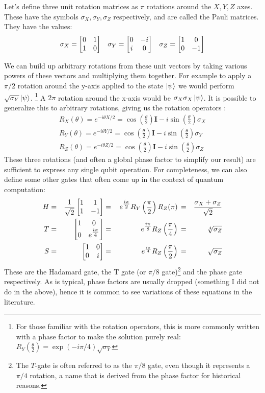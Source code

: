 Let's define three unit rotation matrices as $\pi$ rotations around the $X, Y, Z$ axes. These have the symbols
$\sigma_X, \sigma_Y, \sigma_Z$ respectively, and are called the Pauli matrices.
They have the values:
\begin{align}
  \sigma_X = \begin{bmatrix}0&1\\1&0\end{bmatrix} && \sigma_Y = \begin{bmatrix}0&-i\\i&0\end{bmatrix} && \sigma_Z = \begin{bmatrix}1&0\\0&-1\end{bmatrix}
  \label{eq:pauli}
\end{align}

We can build up arbitrary rotations from these unit vectors by taking various powers of these vectors
and multiplying them together. For example to apply a $\pi/2$ rotation around the y-axis applied to the state $\ket{\psi}$
we would perform $\sqrt{\sigma_Y}\ket{\psi}$. \footnote{For those familiar with the rotation operators,
this is more commonly written with a phase factor to make the solution purely real: $R_Y(\tfrac{\theta}{2})
= \exp(-i\pi/4)\sqrt{\sigma_Y}$}
A $2\pi$ rotation around the x-axis would be $\sigma_X\sigma_X\ket{\psi}$. It is possible to generalize this
to arbitrary rotations, giving us the rotation operators \cite{Nielsen:rot}:
\begin{align}
  R_X(\theta) = e^{-i \theta X/2} = \cos\left(\frac{\theta}{2}\right)\boldsymbol{I} - i \sin\left(\frac{\theta}{2}\right)\sigma_X \\
  R_Y(\theta) = e^{-i \theta Y/2} = \cos\left(\frac{\theta}{2}\right)\boldsymbol{I} - i \sin\left(\frac{\theta}{2}\right)\sigma_Y \\
  R_Z(\theta) = e^{-i \theta Z/2} = \cos\left(\frac{\theta}{2}\right)\boldsymbol{I} - i \sin\left(\frac{\theta}{2}\right)\sigma_Z
\end{align}
These three rotations (and often a global phase factor to simplify our result) are sufficient to express
any single qubit operation. For completeness, we can also define some other gates that often come up in
the context of quantum computation:
\begin{alignat}{4}
    H &=& \frac{1}{\sqrt{2}}\begin{bmatrix}1&1\\1&-1\end{bmatrix} &=& \, e^{\tfrac{i\pi}{2}} R_Y\left(\frac{\pi}{2}\right) R_Z(\pi) \, &=& \frac{\sigma_X+\sigma_Z}{\sqrt{2}} \\
    T &=& \begin{bmatrix}1&0\\0&e^{\tfrac{i\pi}{4}}\end{bmatrix}  &=& \, e^{\tfrac{i\pi}{8}} R_Z\left(\frac{\pi}{4}\right)          \, &=& \sqrt[4]{\sigma_Z} \\
    S &=& \begin{bmatrix}1&0\\0&i\end{bmatrix}                    &=& \, e^{\frac{i \pi}{4}} R_Z\left(\frac{\pi}{2}\right)          \, &=& \sqrt{\sigma_Z}
\end{alignat}
These are the Hadamard gate, the T gate (or $\pi/8$ gate)\footnote{The $T$-gate is often
referred to as the $\pi/8$ gate, even though it represents a $\pi/4$ rotation, a name that is derived from
the phase factor for historical reasons.} and the phase gate respectively.
As is typical, phase factors are usually dropped (something I did not do in the above), hence it is
common to see variations of these equations in the literature.

